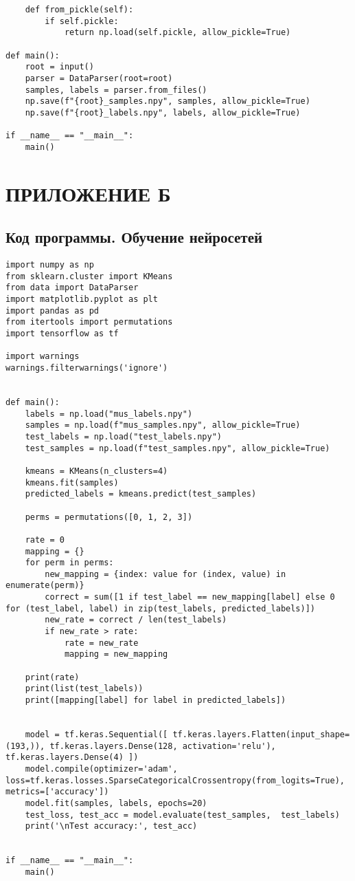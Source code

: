 \begin{footnotesize}
\begin{lstlisting}
    def from_pickle(self):
        if self.pickle:
            return np.load(self.pickle, allow_pickle=True)

def main():
    root = input()
    parser = DataParser(root=root)
    samples, labels = parser.from_files()
    np.save(f"{root}_samples.npy", samples, allow_pickle=True)
    np.save(f"{root}_labels.npy", labels, allow_pickle=True)

if __name__ == "__main__":
    main()

\end{lstlisting}
\end{footnotesize}

\chapter*{ПРИЛОЖЕНИЕ Б}
\section*{\centering Код программы. Обучение нейросетей}
\begin{footnotesize}
\begin{lstlisting}
import numpy as np
from sklearn.cluster import KMeans
from data import DataParser
import matplotlib.pyplot as plt
import pandas as pd
from itertools import permutations 
import tensorflow as tf

import warnings
warnings.filterwarnings('ignore')


def main():
    labels = np.load("mus_labels.npy")
    samples = np.load(f"mus_samples.npy", allow_pickle=True)
    test_labels = np.load("test_labels.npy")
    test_samples = np.load(f"test_samples.npy", allow_pickle=True)

    kmeans = KMeans(n_clusters=4)
    kmeans.fit(samples)
    predicted_labels = kmeans.predict(test_samples)

    perms = permutations([0, 1, 2, 3]) 

    rate = 0
    mapping = {}
    for perm in perms:
        new_mapping = {index: value for (index, value) in enumerate(perm)}
        correct = sum([1 if test_label == new_mapping[label] else 0 for (test_label, label) in zip(test_labels, predicted_labels)])
        new_rate = correct / len(test_labels)
        if new_rate > rate:
            rate = new_rate
            mapping = new_mapping

    print(rate)
    print(list(test_labels))
    print([mapping[label] for label in predicted_labels])


    model = tf.keras.Sequential([ tf.keras.layers.Flatten(input_shape=(193,)), tf.keras.layers.Dense(128, activation='relu'), tf.keras.layers.Dense(4) ])
    model.compile(optimizer='adam', loss=tf.keras.losses.SparseCategoricalCrossentropy(from_logits=True), metrics=['accuracy'])
    model.fit(samples, labels, epochs=20)
    test_loss, test_acc = model.evaluate(test_samples,  test_labels)
    print('\nTest accuracy:', test_acc)


if __name__ == "__main__":
    main()
\end{lstlisting}
\end{footnotesize}